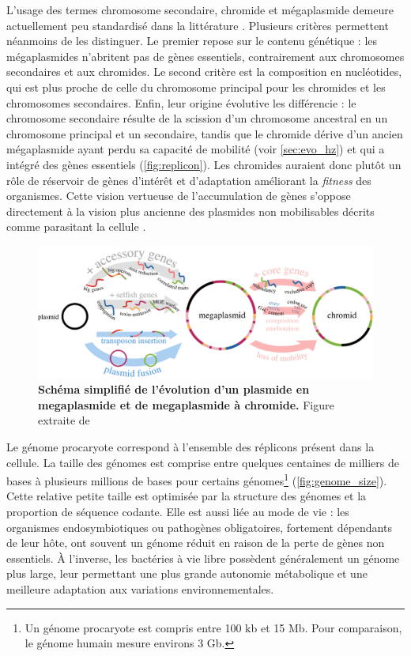 L’usage des termes chromosome secondaire, chromide et mégaplasmide demeure actuellement peu standardisé dans la littérature \cite{hall_what_2021}. Plusieurs critères permettent néanmoins de les distinguer. Le premier repose sur le contenu génétique : les mégaplasmides n’abritent pas de gènes essentiels, contrairement aux chromosomes secondaires et aux chromides. Le second critère est la composition en nucléotides, qui est plus proche de celle du chromosome principal pour les chromides et les chromosomes secondaires. Enfin, leur origine évolutive les différencie : le chromosome secondaire résulte de la scission d’un chromosome ancestral en un chromosome principal et un secondaire, tandis que le chromide dérive d’un ancien mégaplasmide ayant perdu sa capacité de mobilité (voir \autoref{sec:evo_hz}) et qui a intégré des gènes essentiels (\autoref{fig:replicon}). Les chromides auraient donc plutôt un rôle de réservoir de gènes d'intérêt et d'adaptation améliorant la \textit{fitness} des organismes. Cette vision vertueuse de l'accumulation de gènes s'oppose directement à la vision plus ancienne des plasmides non mobilisables décrits comme parasitant la cellule \cite{levin_accessory_1993,lili_persistence_2007}.

\begin{figure}[htbp]
    \centering
    \includegraphics[width=.95\textwidth]{images/replicon.jpg}
    \caption[Évolution d'un plasmide en chromid]{\textbf{Schéma simplifié de l'évolution d'un plasmide en megaplasmide et de megaplasmide à chromide.} Figure extraite de \cite{hall_what_2021}}
    \label{fig:replicon}
\end{figure}

\newpage

Le génome procaryote correspond à l'ensemble des réplicons présent dans la cellule. La taille des génomes est comprise entre quelques centaines de milliers de bases à plusieurs millions de bases pour certains génomes\footnote{Un génome procaryote est compris entre 100 kb et 15 Mb. Pour comparaison, le génome humain mesure environs 3 Gb.} (\autoref{fig:genome_size}). Cette relative petite taille est optimisée par la structure des génomes et la proportion de séquence codante. Elle est aussi liée au mode de vie : les organismes endosymbiotiques ou pathogènes obligatoires, fortement dépendants de leur hôte, ont souvent un génome réduit en raison de la perte de gènes non essentiels. À l’inverse, les bactéries à vie libre possèdent généralement un génome plus large, leur permettant une plus grande autonomie métabolique et une meilleure adaptation aux variations environnementales.


